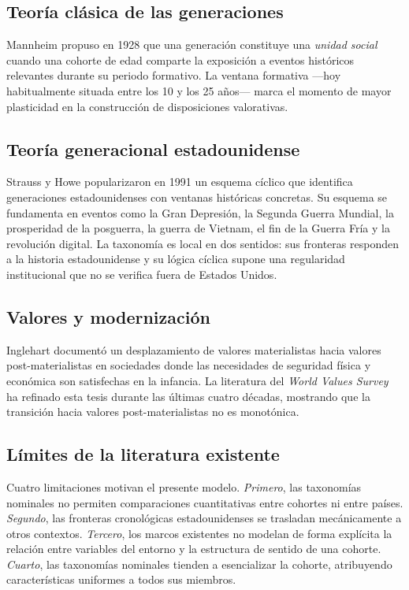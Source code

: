 \documentclass[conference,spanish]{IEEEtran}
\begin{document}
\subsection{Teoría clásica de las generaciones}

Mannheim \cite{mannheim1928} propuso en 1928 que una generación constituye una \textit{unidad social} cuando una cohorte de edad comparte la exposición a eventos históricos relevantes durante su periodo formativo. La ventana formativa ---hoy habitualmente situada entre los 10 y los 25 años--- marca el momento de mayor plasticidad en la construcción de disposiciones valorativas.

\subsection{Teoría generacional estadounidense}

Strauss y Howe \cite{strauss1991} popularizaron en 1991 un esquema cíclico que identifica generaciones estadounidenses con ventanas históricas concretas. Su esquema se fundamenta en eventos como la Gran Depresión, la Segunda Guerra Mundial, la prosperidad de la posguerra, la guerra de Vietnam, el fin de la Guerra Fría y la revolución digital. La taxonomía es local en dos sentidos: sus fronteras responden a la historia estadounidense y su lógica cíclica supone una regularidad institucional que no se verifica fuera de Estados Unidos.

\subsection{Valores y modernización}

Inglehart \cite{inglehart1977} documentó un desplazamiento de valores materialistas hacia valores post-materialistas en sociedades donde las necesidades de seguridad física y económica son satisfechas en la infancia. La literatura del \textit{World Values Survey} \cite{wvs2022} ha refinado esta tesis durante las últimas cuatro décadas, mostrando que la transición hacia valores post-materialistas no es monotónica.

\subsection{Límites de la literatura existente}

Cuatro limitaciones motivan el presente modelo. \textit{Primero}, las taxonomías nominales no permiten comparaciones cuantitativas entre cohortes ni entre países. \textit{Segundo}, las fronteras cronológicas estadounidenses se trasladan mecánicamente a otros contextos. \textit{Tercero}, los marcos existentes no modelan de forma explícita la relación entre variables del entorno y la estructura de sentido de una cohorte. \textit{Cuarto}, las taxonomías nominales tienden a esencializar la cohorte, atribuyendo características uniformes a todos sus miembros.
\end{document}
